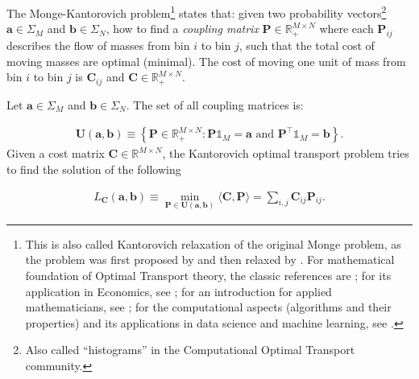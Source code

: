 

The Monge-Kantorovich problem\footnote{
  This is also called Kantorovich relaxation of the original Monge problem,
  as the problem was first proposed by \citet{monge1781} and then relaxed by \citet{kantorovich1942}.
  For mathematical foundation of Optimal Transport theory, the classic references are \citet{villani2003,villani2008};
  for its application in Economics, see \citet{galichon2016};
  for an introduction for applied mathematicians, see \citet{santambrogio2015a};
  for the computational aspects (algorithms and their properties) and its applications in data science and machine learning,
  see \citet{peyre2019}.
} states that:
given two probability vectors\footnote{
  Also called ``histograms'' in the Computational Optimal Transport community.
} $\mathbf{a} \in \Sigma_M$ and $\mathbf{b} \in \Sigma_N$,
how to find a \textit{coupling matrix} $\mathbf{P} \in \mathbb{R}_+^{M \times N}$
where each $\mathbf{P}_{ij}$ describes the flow of masses from bin $i$ to bin $j$,
such that the total cost of moving masses are optimal (minimal).
The cost of moving one unit of mass from bin $i$ to bin $j$ is $\mathbf{C}_{ij}$ and $\mathbf{C} \in \mathbb{R}_+^{M\times N}$.

\begin{problem}
Let $\mathbf{a} \in \Sigma_M$ and $\mathbf{b} \in \Sigma_N$.
The set of all coupling matrices is:

\begin{equation}\label{eqn-def:coupling-matrix}
  \begin{aligned}
    \mathbf{U(a,b)} \equiv \left\{
    \mathbf{P} \in \mathbb{R}_+^{M \times N}:
    \mathbf{P} \mathbb{1}_M = \mathbf{a}
    \text{ and }
    \mathbf{P}^\top \mathbb{1}_M = \mathbf{b}
    \right\}.
  \end{aligned}
\end{equation}
Given a cost matrix $\mathbf{C} \in \mathbb{R}^{M \times N}$,
the Kantorovich optimal transport problem tries to find the solution of the following

\begin{equation}\label{eqn:loss-kantorovich}
  \begin{aligned}
    L_{\mathbf{C}}(\mathbf{a}, \mathbf{b})
    \equiv \min_{\mathbf{P} \in \mathbf{U}(\mathbf{a},\mathbf{b})}
    \langle \mathbf{C}, \mathbf{P}\rangle
    = \sum_{i,j} \mathbf{C}_{ij} \mathbf{P}_{ij}.
  \end{aligned}
\end{equation}
\end{problem}

